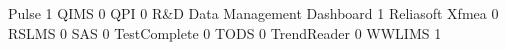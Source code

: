\documentclass{article}
\begin{document}
\begin{Schunk}
\begin{Soutput}
  Pulse                                                                 1
  QIMS                                                                  0
  QPI                                                                   0
  R&D Data Management Dashboard                                         1
  Reliasoft Xfmea                                                       0
  RSLMS                                                                 0
  SAS                                                                   0
  TestComplete                                                          0
  TODS                                                                  0
  TrendReader                                                           0
  WWLIMS                                                                1
                                          

\end{Soutput}
\end{Schunk}
\end{document}
